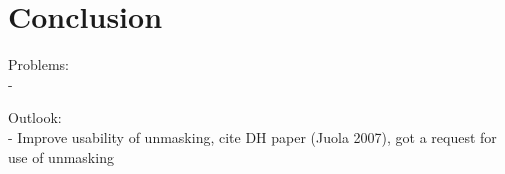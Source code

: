 \chapter{Conclusion}\label{conclusion}

Problems:\\
-

Outlook:\\
- Improve usability of unmasking, cite DH paper (Juola 2007), got a request for use of unmasking